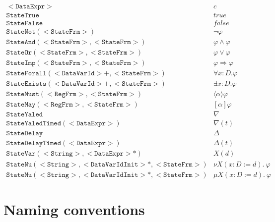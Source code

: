 \documentclass{article}
\begin{document}
\begin{equation*}
\begin{array}{ll}
\mathtt{<DataExpr> } & c \\
\mathtt{StateTrue } & true \\
\mathtt{StateFalse } & false \\
\mathtt{StateNot(<StateFrm>) } & \neg \varphi \\
\mathtt{StateAnd(<StateFrm>, <StateFrm>) } & \varphi \wedge \varphi \\
\mathtt{StateOr(<StateFrm>, <StateFrm>) } & \varphi \vee \varphi \\
\mathtt{StateImp(<StateFrm>, <StateFrm>) } & \varphi \Rightarrow \varphi \\
\mathtt{StateForall(<DataVarId>+, <StateFrm>) } & \forall x{:}D .\varphi \\
\mathtt{StateExists(<DataVarId>+, <StateFrm>) } & \exists x{:}D .\varphi \\
\mathtt{StateMust(<RegFrm>, <StateFrm>) } & \langle\alpha\rangle \varphi \\
\mathtt{StateMay(<RegFrm>, <StateFrm>) } & [\alpha] \varphi \\
\mathtt{StateYaled } & \nabla \\
\mathtt{StateYaledTimed(<DataExpr>) } & \nabla(t) \\
\mathtt{StateDelay } & \Delta \\
\mathtt{StateDelayTimed(<DataExpr>) } & \Delta(t) \\
\mathtt{StateVar(<String>, <DataExpr>\ast) } & X(d) \\
\mathtt{StateNu(<String>, <DataVarIdInit>\ast, <StateFrm>)} & \nu X(x{:}%
D:=d).~\varphi \\
\mathtt{StateMu(<String>, <DataVarIdInit>\ast, <StateFrm>)} & \mu X(x{:}%
D:=d).~\varphi%
\end{array}%
\end{equation*}

\section{Naming conventions}
\end{document}
